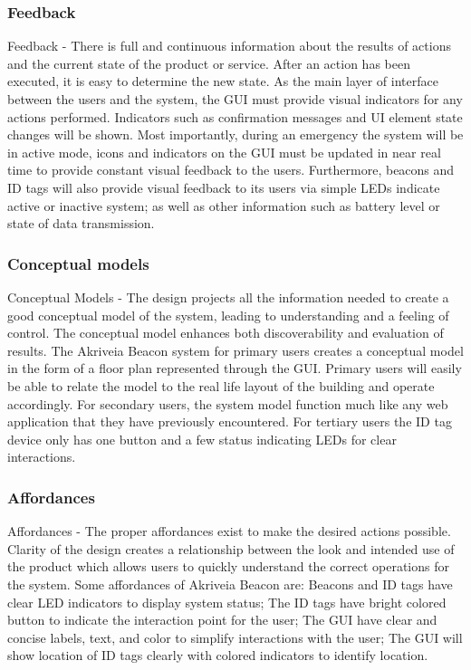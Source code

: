 \subsubsection{Feedback}
\medskip
Feedback - There is full and continuous information about the results of actions and the current state of the product or service. After an action has been executed, it is easy to determine the new state. As the main layer of interface between the users and the system, the GUI must provide visual indicators for any actions performed. Indicators such as confirmation messages and UI element state changes will be shown. Most importantly, during an emergency the system will be in active mode, icons and indicators on the GUI must be updated in near real time to provide constant visual feedback to the users. Furthermore, beacons and ID tags will also provide visual feedback to its users via simple LEDs indicate active or inactive system; as well as other information such as battery level or state of data transmission. 
\pagebreak


\subsubsection{Conceptual models}
\medskip
Conceptual Models - The design projects all the information needed to create a good conceptual model of the system, leading to understanding and a feeling of control. The conceptual model enhances both discoverability and evaluation of results. The Akriveia Beacon system for primary users creates a conceptual model in the form of a floor plan represented through the GUI. Primary users will easily be able to relate the model to the real life layout of the building and operate accordingly. For secondary users, the system model function much like any web application that they have previously encountered. For tertiary users the ID tag device only has one button and a few status indicating LEDs for clear interactions.
\medskip


\subsubsection{Affordances}
\medskip
Affordances - The proper affordances exist to make the desired actions possible. Clarity of the design creates a relationship between the look and intended use of the product which allows users to quickly understand the correct operations for the system. Some affordances of Akriveia Beacon are: Beacons and ID tags have clear LED indicators to display system status; The ID tags have bright colored button to indicate the interaction point for the user; The GUI have clear and concise labels, text, and color to simplify interactions with the user; The GUI will show location of ID tags clearly with colored indicators to identify location.
\medskip
